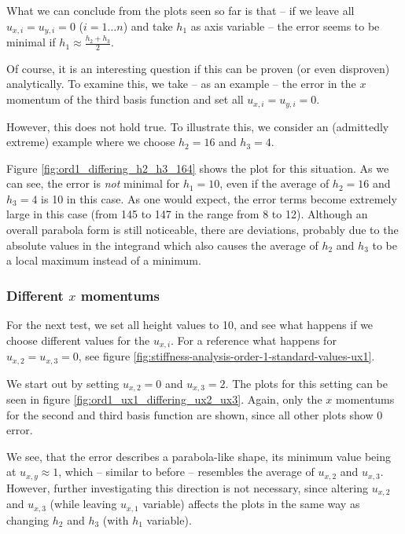 \documentclass{article}
\newcommand{\todo}[2][]{\textcolor{red}{TODO\ifthenelse{\equal{#1}{}}{}{[#1]}: #2}}
\begin{document}
What we can conclude from the plots seen so far is that -- if we leave all $u_{x,i}=u_{y,i}=0$ ($i=1\dots n$) and take $h_1$ as axis variable -- the error seems to be minimal if $h_1\approx \frac{h_2+h_3}{2}$.

Of course, it is an interesting question if this can be proven (or even disproven) analytically. To examine this, we take -- as an example -- the error in the $x$ momentum of the third basis function and set all $u_{x,i}=u_{y,i}=0$.

However, this does not hold true.
To illustrate this, we consider an (admittedly extreme) example where we choose $h_2=16$ and $h_3=4$.



Figure \ref{fig:ord1_differing_h2_h3_164} shows the plot for this situation. As we can see, the error is \emph{not} minimal for $h_1=10$, even if the average of $h_2=16$ and $h_3=4$ is 10 in this case. As one would expect, the error terms become extremely large in this case (from 145 to 147 in the range from 8 to 12). Although an overall parabola form is still noticeable, there are deviations, probably due to the absolute values in the integrand which also causes the average of $h_2$ and $h_3$ to be a local maximum instead of a minimum.

\subsubsection{\texorpdfstring{Different $x$ momentums}{Different x momentums}}
\label{sec:stiffness-analysis-ord1-nonstandard-diff-ux}

For the next test, we set all height values to 10, and see what happens if we choose different values for the $u_{x,i}$. For a reference what happens for $u_{x,2}=u_{x,3}=0$, see figure \ref{fig:stiffness-analysis-order-1-standard-values-ux1}.

We start out by setting $u_{x,2}=0$ and $u_{x,3}=2$. The plots for this setting can be seen in figure \ref{fig:ord1_ux1_differing_ux2_ux3}. Again, only the $x$ momentums for the second and third basis function are shown, since all other plots show 0 error.



We see, that the error describes a parabola-like shape, its minimum value being at $u_{x,y}\approx 1$, which -- similar to before -- resembles the average of $u_{x,2}$ and $u_{x,3}$. However, further investigating this direction is not necessary, since altering $u_{x,2}$ and $u_{x,3}$ (while leaving $u_{x,1}$ variable) affects the plots in the same way as changing $h_2$ and $h_3$ (with $h_1$ variable).
\end{document}
